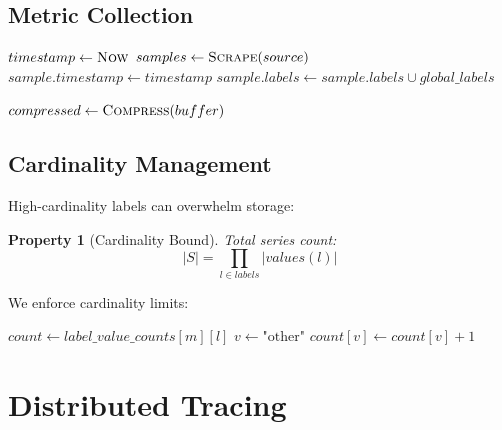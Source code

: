 \documentclass[11pt,a4paper]{article}
\newtheorem{property}{Property}
\begin{document}
\subsection{Metric Collection}

\begin{algorithm}
\caption{Metric Collection Pipeline}
\begin{algorithmic}[1]
    \State $timestamp \gets \Call{Now}{}$
        \State $samples \gets \Call{Scrape}{source}$
            \State $sample.timestamp \gets timestamp$
            \State $sample.labels \gets sample.labels \cup global\_labels$
            \State {}
        \EndFor
    \EndFor
        \State {}
    \EndIf
\EndProcedure

    \State $compressed \gets \Call{Compress}{buffer}$
    \State {}
    \State {}
\EndProcedure
\end{algorithmic}
\end{algorithm}

\subsection{Cardinality Management}

High-cardinality labels can overwhelm storage:

\begin{property}[Cardinality Bound]
Total series count:
\[
|S| = \prod_{l \in labels} |values(l)|
\]
\end{property}

We enforce cardinality limits:

\begin{algorithm}
\caption{Cardinality Limiting}
\begin{algorithmic}[1]
    \State $count \gets label\_value\_counts[m][l]$
        \State $v \gets \text{"other"}$ 
    \EndIf
    \State $count[v] \gets count[v] + 1$
\EndProcedure
\end{algorithmic}
\end{algorithm}

\section{Distributed Tracing}
\end{document}
